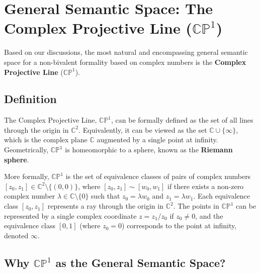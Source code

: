 














	\section{General Semantic Space: The Complex Projective Line ($\mathbb{CP}^1$)}
	
	Based on our discussions, the most natural and encompassing general semantic space for a non-bivalent formality based on complex numbers is the \textbf{Complex Projective Line} ($\mathbb{CP}^1$).
	
	\subsection{Definition}
	
	The Complex Projective Line, $\mathbb{CP}^1$, can be formally defined as the set of all lines through the origin in $\mathbb{C}^2$. Equivalently, it can be viewed as the set $\mathbb{C} \cup \{\infty\}$, which is the complex plane $\mathbb{C}$ augmented by a single point at infinity. Geometrically, $\mathbb{CP}^1$ is homeomorphic to a sphere, known as the \textbf{Riemann sphere}.
	
	More formally, $\mathbb{CP}^1$ is the set of equivalence classes of pairs of complex numbers $[z_0, z_1] \in \mathbb{C}^2 \setminus \{(0,0)\}$, where $[z_0, z_1] \sim [w_0, w_1]$ if there exists a non-zero complex number $\lambda \in \mathbb{C} \setminus \{0\}$ such that $z_0 = \lambda w_0$ and $z_1 = \lambda w_1$. Each equivalence class $[z_0, z_1]$ represents a ray through the origin in $\mathbb{C}^2$. The points in $\mathbb{CP}^1$ can be represented by a single complex coordinate $z = z_1/z_0$ if $z_0 \neq 0$, and the equivalence class $[0, 1]$ (where $z_0 = 0$) corresponds to the point at infinity, denoted $\infty$.
	
	\subsection{Why $\mathbb{CP}^1$ as the General Semantic Space?}
	
